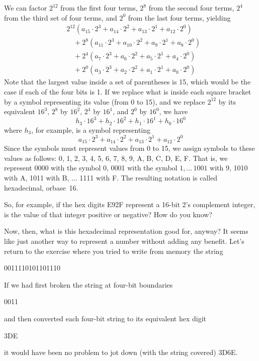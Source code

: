 \documentclass{patt}
\begin{document}
We can factor $2^{12}$ from the first four terms,
$2^8$ from the second four terms, $2^4$ from the third set
of four terms, and $2^0$ from the last four terms, yielding
\begin{align*}
&2^{12}(a_{15}\cdot 2^3+a_{14}\cdot 2^2+a_{13}\cdot 2^1+a_{12}\cdot 2^0)\\
&\quad + 2^8(a_{11}\cdot 2^3+a_{10}\cdot 2^2 + a_9\cdot 2^1+a_8\cdot 2^0)\\
&\quad+ 2^4(a_7\cdot 2^3+a_6\cdot 2^2+ a_5\cdot 2^1+a_4\cdot 2^0)\\
&\quad + 2^0(a_3\cdot 2^3+a_2\cdot 2^2+a_1\cdot 2^1+a_0\cdot 2^0)
\end{align*}
Note that the largest value inside a set of parentheses
is 15, which would be the case if each of the four bits
is 1.  If we replace what is inside each square bracket by a
symbol representing its value (from 0 to 15), and we replace
$2^{12}$ by its equivalent $16^3$, $2^8$ by $16^2$, $2^4$ by
$16^1$, and $2^0$ by $16^0$, we have
\begin{equation*}
h_3\cdot 16^3+h_2\cdot 16^2+h_1\cdot 16^1+h_0\cdot 16^0
\end{equation*}
where $h_3$, for example, is a symbol representing
\begin{equation*}
a_{15}\cdot 2^3+a_{14}\cdot 2^2+a_{13}\cdot 2^1+a_{12}\cdot 2^0
\end{equation*}
Since the symbols must represent values from 0 to 15,
we assign symbols to these values as follows: 0, 1, 2, 3, 4, 5,
6, 7, 8, 9, A, B, C, D, E, F.  That is, we represent 0000 with
the symbol 0, 0001 with the symbol $1,\ldots\,1001$ with 9, 1010
with A, 1011 with B, $\ldots$ 1111 with F. The resulting notation
is called hexadecimal, or\break base~16.

So, for example, if the hex digits E92F represent a 16-bit 2's
complement integer, is the value of that integer positive or
negative?  How do you know?

Now, then, what is this hexadecimal representation good for,
anyway?  It seems like just another way to represent a number
without adding any benefit.  Let's return to the exercise where
you tried to write from memory the string

\begin{cctable}
0011110101101110
\end{cctable}
If we had first broken the string at four-bit boundaries

\begin{cctable}
0011
\end{cctable}
\noindent
and then converted each four-bit string to its equivalent hex digit
\begin{cctable}
3\quad D\quad E
\end{cctable}
\noindent
it would have been no problem to jot down (with the string covered)
3D6E.
\end{document}
